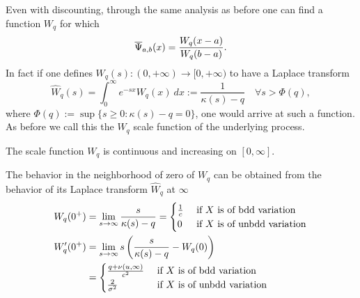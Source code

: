 Even with discounting, through the same analysis as before one can find a function $W_q$ for which
\[ \overline{\Psi}_{a,b}(x) = \frac{W_q(x-a)}{W_q(b-a)}. \]
In fact if one defines $W_q(s): (0,+\infty) \rightarrow [0,+\infty)$ to have a Laplace transform
\[ \hat{W}_q(s) = \int_0^{\infty} e^{-sx} W_q(x) ~dx  := \frac{1}{\kappa(s) - q} \quad \forall s > \Phi (q), \]
where $\Phi (q) := \sup \{ s\geq 0 : \kappa(s) - q = 0 \}$, one would arrive at such a function. As before we call this the $W_q$ scale function of the underlying process.\\

\begin{rmk} 
The scale function $W_q$ is continuous and increasing on $[0,\infty]$.
\end{rmk}

\begin{rmk} 
The behavior in the neighborhood of zero of $W_q$ can be obtained from the behavior of its Laplace transform $\hat{W}_q$ at $\infty$
\begin{align}
\label{W0}
W_q (0^+) &= \lim_{s\rightarrow \infty} \frac{s}{\kappa(s)-q}= \begin{cases} \frac{1}{c} &\text{ if $X$ is of bdd variation}\\ 0 &
\text{ if $X$ is of unbdd variation} \end{cases}\\
\nonumber  W'_q (0^+) &= \lim_{s\rightarrow \infty} s\left( \frac{s}{\kappa(s)-q} - W_q(0) \right) \\
\label{Wprime0} &= \begin{cases} \frac{q + \nu (u,\infty)}{c^2} &\text{ if $X$ is of bdd variation}\\ \frac{2}{\sigma^2} & \text{ if $X$ is of unbdd variation} \end{cases}
\end{align}
\end{rmk}
